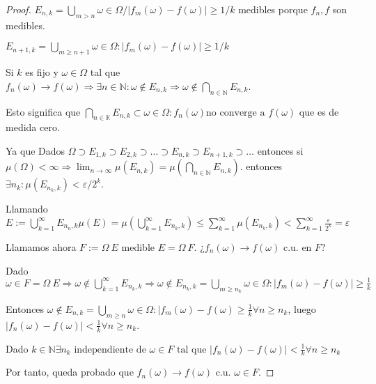 \begin{proof}
  $E_{n,k} = \bigcup_{m > n} {\omega \in \Omega / |f_{m}(\omega) -f(\omega)|
    \geq 1/k}$ medibles porque $f_{n}, f$ son medibles.

  $E_{n+1,k} = \bigcup_{m \geq n+1} {\omega \in \Omega : |f_{m}(\omega) -
    f(\omega)| \geq 1/k}$

  Si $k$ es fijo y $\omega \in \Omega$ tal que ${f_{n}(\omega)} \rightarrow
  f(\omega) \Rightarrow \exists n \in \mathbb N : \omega \notin E_{n,k}
  \Rightarrow \omega \notin \bigcap_{n \in \mathbb N} E_{n,k}$.

  Esto significa que $\bigcap_{n \in \mathbb K} E_{n,k} \subset {\omega \in \Omega
    : f_{n}(\omega) \text{no converge a } f(\omega)} $ que es de medida cero.

  Ya que Dados $\Omega \supset E_{1,k} \supset E_{2,k} \supset \hdots \supset E_{n,k} \supset
  E_{n+1,k} \supset \hdots$ entonces si $\mu(\Omega) < \infty \Rightarrow
  \lim_{n\to\infty} \mu(E_{n,k}) = \mu(\bigcap_{n \in \mathbb N}
  E_{n,k})$. entonces $\exists n_{k} : \mu(E_{n_{k},k}) <
  \varepsilon/2^{k}$.

  Llamando $E := \bigcup_{k=1}^{\infty} E_{n_{n},k} \mu(E) =
  \mu(\bigcup_{k=1}^{\infty}E_{n_{k},k}) \leq \sum_{k=1}^{\infty}
  \mu(E_{n_{k},k}) < \sum_{k=1}^{\infty} \frac{\varepsilon}{2^{k}} =
  \varepsilon$

  Llamamos ahora $F:=\Omega \ E $ medible $E = \Omega \
  F$. ¿$f_{n}(\omega) \rightarrow f(\omega)$ c.u. en $F$?

  Dado $\omega \in F = \Omega \ E \Rightarrow \omega \notin
  \bigcup_{k=1}^{\infty} E_{n_{k},k} \Rightarrow \omega \notin E_{n_{k},k}
  = \bigcup_{m \geq n_{k}} {\omega \in \Omega : |f_{m}(\omega) -
    f(\omega)| \geq \frac{1}{k} }$

  Entonces $\omega \notin E_{n,k} = \bigcup_{m\geq n} {\omega \in \Omega :
    |f_{m}(\omega) - f(\omega) \geq \frac{1}{k}} \forall n \geq n_{k}$,
  luego $|f_{n}(\omega)- f(\omega)| < \frac{1}{k} \forall n \geq n_{k}$.

  Dado $k \in \mathbb N \exists n_{k} \text{ independiente de } \omega \in F
  \text{ tal que } |f_{n}(\omega) -
  f(\omega)| < \frac{1}{k} \forall n \geq n_{k}$

  Por tanto, queda probado que ${f_{n}(\omega)} \rightarrow f(\omega)$
  c.u. $\omega \in F$.


\end{proof}

